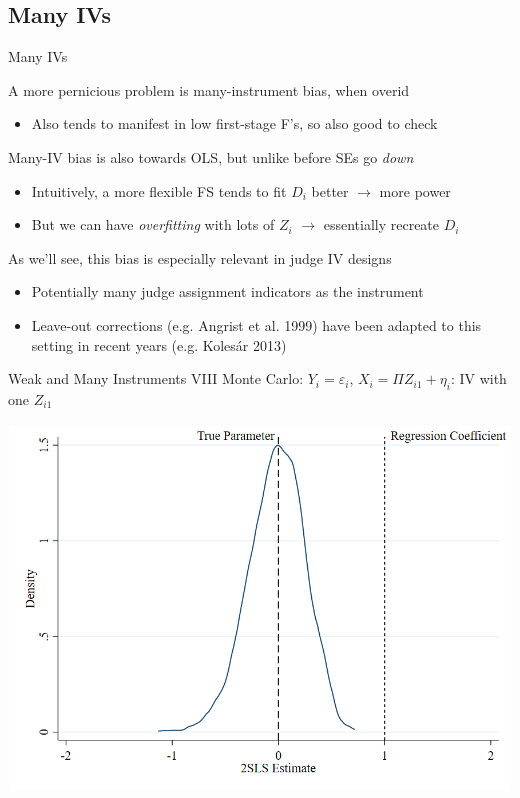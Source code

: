 \documentclass{beamer}
\begin{document}
\subsection{Many IVs}
\begin{frame}{Many IVs}

A more pernicious problem is many-instrument bias, when overid\smallskip
\begin{itemize}
  \item Also tends to manifest in low first-stage F's, so also good to check
\end{itemize}\bigskip\pause{}

Many-IV bias is also towards OLS, but unlike before SEs go \emph{down}\smallskip
\begin{itemize}
  \item Intuitively, a more flexible FS tends to fit $D_i$ better $\rightarrow$ more power\smallskip
  \item But we can have \emph{overfitting} with lots of $Z_i$ $\rightarrow$ essentially recreate $D_i$
\end{itemize}\bigskip\pause{}

As we'll see, this bias is especially relevant in judge IV designs\smallskip
\begin{itemize}
  \item Potentially many judge assignment indicators as the instrument\smallskip
  \item Leave-out corrections (e.g. Angrist et al. 1999) have been adapted to this setting in recent years (e.g. Koles\'{a}r 2013)
\end{itemize}

\end{frame}

\begin{frame}{Weak and Many Instruments VIII}
Monte Carlo: $Y_i=\varepsilon_i$, $X_i=\Pi Z_{i1}+\eta_i$: IV with one $Z_{i1}$
\begin{center}
\includegraphics[scale=0.35]{./lecture_includes/fewz.png}
\end{center}

\end{frame}
\end{document}
